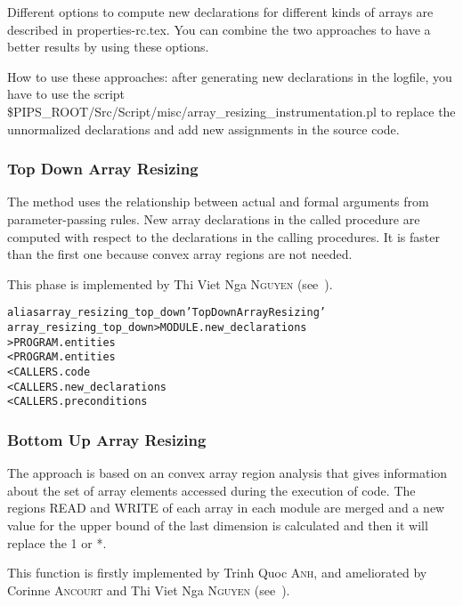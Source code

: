 \documentclass[a4paper]{report}
\newenvironment{PipsMake}{\begin{alltt}}{\end{alltt}}
\newenvironment{PipsPass}[1]{\label{pass:#1}}{}
\begin{document}
Different options to compute new declarations for different kinds of
arrays are described in properties-rc.tex. You can combine the two
approaches to have a better results by using these options.

How to use these approaches: after generating new declarations in the
logfile, you have to use the script
\$PIPS\_ROOT/Src/Script/misc/array\_resizing\_instrumentation.pl to replace the unnormalized
declarations and add new assignments in the source code.


\subsubsection{Top Down Array Resizing}
\begin{PipsPass}{array_resizing_top_down}

The  method uses the relationship between actual and formal arguments from parameter-passing
rules. New array declarations in the called procedure are
computed with respect to the declarations in the calling procedures.
It is  faster than the first one because convex array regions are not needed.

This phase is implemented by Thi Viet Nga \textsc{Nguyen} (see~\cite{Ngu02}).
\end{PipsPass}

\begin{PipsMake}
alias array_resizing_top_down 'Top Down Array Resizing'
array_resizing_top_down         > MODULE.new_declarations
                                > PROGRAM.entities
        < PROGRAM.entities
        < CALLERS.code
        < CALLERS.new_declarations
        < CALLERS.preconditions
\end{PipsMake}

\subsubsection{Bottom Up Array Resizing}

\begin{PipsPass}{array_resizing_bottom_up}

The approach is based on an convex array region analysis that gives
  information about the set of array elements accessed during the
  execution of code. The regions READ and WRITE of each
array in each module are merged and a new value for the upper bound of the last
dimension is calculated and then it will replace the 1 or *.

This function is firstly implemented by Trinh Quoc \textsc{Anh}, and
ameliorated by Corinne \textsc{Ancourt} and Thi Viet Nga \textsc{Nguyen} (see~\cite{Ngu02}).
\end{PipsPass}
\end{document}
